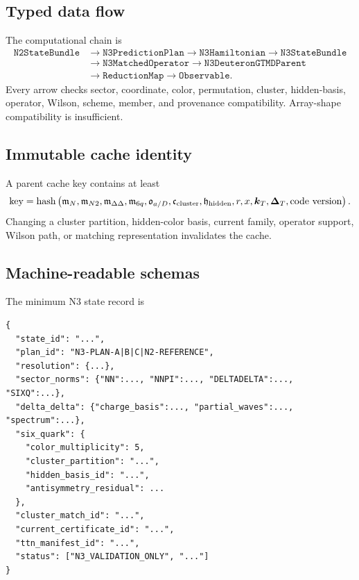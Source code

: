 \documentclass[11pt]{article}
\newcommand{\kT}{\bm{k}_{T}}
\newcommand{\DT}{\bm{\Delta}_{T}}
\begin{document}
\subsection{Typed data flow}

The computational chain is
\begin{equation}
\begin{aligned}
\texttt{N2StateBundle}
&\longrightarrow \texttt{N3PredictionPlan}
\longrightarrow \texttt{N3Hamiltonian}
\longrightarrow \texttt{N3StateBundle}\\
&\longrightarrow \texttt{N3MatchedOperator}
\longrightarrow \texttt{N3DeuteronGTMDParent}\\
&\longrightarrow \texttt{ReductionMap}
\longrightarrow \texttt{Observable}.
\end{aligned}
\label{eq:n3-data-flow}
\end{equation}
Every arrow checks sector, coordinate, color, permutation, cluster, hidden-basis, operator, Wilson, scheme, member, and provenance compatibility.  Array-shape compatibility is insufficient.

\subsection{Immutable cache identity}

A parent cache key contains at least
\begin{equation}
 \mathrm{key}=\mathrm{hash}
 \left(
 \mathfrak m_N,
 \mathfrak m_{N2},
 \mathfrak m_{\Delta\Delta},
 \mathfrak m_{6q},
 \mathfrak o_{a/D},
 \mathfrak c_{\rm cluster},
 \mathfrak h_{\rm hidden},
 r,
 x,\kT,\DT,
 \text{code version}
 \right).
\label{eq:n3-cache-key}
\end{equation}
Changing a cluster partition, hidden-color basis, current family, operator support, Wilson path, or matching representation invalidates the cache.

\subsection{Machine-readable schemas}

The minimum N3 state record is
\begin{verbatim}
{
  "state_id": "...",
  "plan_id": "N3-PLAN-A|B|C|N2-REFERENCE",
  "resolution": {...},
  "sector_norms": {"NN":..., "NNPI":..., "DELTADELTA":..., "SIXQ":...},
  "delta_delta": {"charge_basis":..., "partial_waves":..., "spectrum":...},
  "six_quark": {
    "color_multiplicity": 5,
    "cluster_partition": "...",
    "hidden_basis_id": "...",
    "antisymmetry_residual": ...
  },
  "cluster_match_id": "...",
  "current_certificate_id": "...",
  "ttn_manifest_id": "...",
  "status": ["N3_VALIDATION_ONLY", "..."]
}
\end{verbatim}
\end{document}
